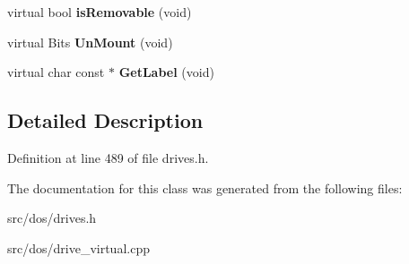 \begin{DoxyCompactItemize}
\item 
\hypertarget{classVirtual__Drive_a0be0807a2cc522a60baed239a2c420fb}{virtual bool {\bfseries is\-Removable} (void)}\label{classVirtual__Drive_a0be0807a2cc522a60baed239a2c420fb}

\item 
\hypertarget{classVirtual__Drive_acc65a1146b71de3da99281217bacbb65}{virtual Bits {\bfseries Un\-Mount} (void)}\label{classVirtual__Drive_acc65a1146b71de3da99281217bacbb65}

\item 
\hypertarget{classVirtual__Drive_af75083c9925f93c99fab3c424d10f212}{virtual char const $\ast$ {\bfseries Get\-Label} (void)}\label{classVirtual__Drive_af75083c9925f93c99fab3c424d10f212}

\end{DoxyCompactItemize}


\subsection{Detailed Description}


Definition at line 489 of file drives.\-h.



The documentation for this class was generated from the following files\-:\begin{DoxyCompactItemize}
\item 
src/dos/drives.\-h\item 
src/dos/drive\-\_\-virtual.\-cpp\end{DoxyCompactItemize}
